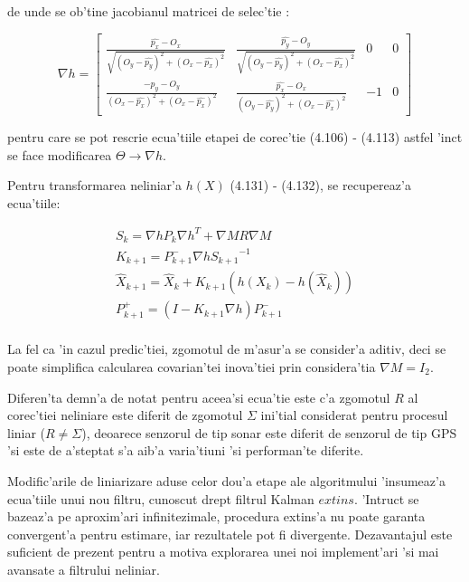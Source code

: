 \documentclass[12pt,a4paper,twoside]{report}
\begin{document}
de unde se ob'tine jacobianul matricei de selec'tie \cite{Simulink}:

\begin{equation}
\nabla h =   \begin{bmatrix}
    \frac{\hat{p_x} - O_x}{\sqrt{(O_y - \hat{p_y})^2 + (O_x - \hat{p_x})^2 }} &  \frac{\hat{p_y} - O_y}{\sqrt{(O_y - \hat{p_y})^2 + (O_x - \hat{p_x})^2 }} & 0 & 0 \\
    \frac{-\hat{p_y} - O_y}{{(O_x - \hat{p_x})^2 + (O_x - \hat{p_x})^2 }} &  \frac{\hat{p_x} - O_x}{{(O_y - \hat{p_y})^2 + (O_x - \hat{p_x})^2 }} & -1 &  0 
    \end{bmatrix}
\end{equation}

pentru care se pot rescrie ecua'tiile etapei de corec'tie (4.106) - (4.113) astfel 'inc\ia t se face modificarea $\Theta \to \nabla h$.

Pentru transformarea neliniar'a $h(X)$ (4.131) - (4.132), se recupereaz'a ecua'tiile:

\begin{gather}
S_{k} = \nabla h P_k {\nabla h}^T + \nabla M R \nabla M\\
K_{k+1} = P^-_{k+1} \nabla h {S_{k+1}}^{-1} \\
\hat X_{k+1} = \hat X_k + K_{k+1} (h(X_k) -  h(\hat X_k)) \\
P^+_{k+1} = (I - K_{k+1} \nabla h) P^-_{k+1} \\
\end{gather}

La fel ca 'in cazul predic'tiei, zgomotul de m'asur'a se consider'a aditiv, deci se poate simplifica calcularea covarian'tei inova'tiei prin considera'tia $\nabla M = I_2$.

\vspace{5px}

Diferen'ta demn'a de notat pentru aceea'si ecua'tie este c'a zgomotul $R$ al corec'tiei neliniare este diferit de zgomotul $\Sigma$ ini'tial considerat pentru procesul liniar ($ R \neq \Sigma $), deoarece senzorul de tip sonar este diferit de senzorul de tip GPS 'si este de a'steptat s'a aib'a varia'tiuni 'si performan'te diferite. 

\vspace{5px}

Modific'arile de liniarizare aduse celor dou'a etape ale algoritmului 'insumeaz'a ecua'tiile unui nou filtru, cunoscut drept filtrul Kalman $extins$. 'Intruc\ia t se bazeaz'a pe aproxim'ari infinitezimale, procedura extins'a nu poate garanta convergent'a pentru estimare, iar rezultatele pot fi divergente. Dezavantajul este suficient de prezent pentru a motiva explorarea unei noi implement'ari 'si mai avansate a filtrului neliniar. 
\end{document}

